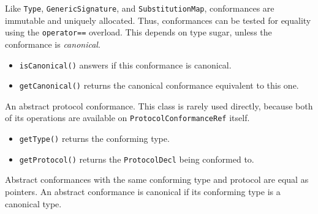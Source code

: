 \documentclass[../generics]{subfiles}
\begin{document}
Like \texttt{Type}, \texttt{GenericSignature}, and \texttt{SubstitutionMap}, conformances are immutable and uniquely allocated. Thus, conformances can be tested for equality using the \texttt{operator==} overload. This depends on type sugar, unless the conformance is \emph{canonical}.
\begin{itemize}
\item \texttt{isCanonical()} answers if this conformance is canonical.
\item \texttt{getCanonical()} returns the canonical conformance equivalent to this one.
\end{itemize}

An abstract protocol conformance. This class is rarely used directly, because both of its operations are available on \texttt{ProtocolConformanceRef} itself.
 \begin{itemize}
\item \texttt{getType()} returns the conforming type.
\item \texttt{getProtocol()} returns the \texttt{ProtocolDecl} being conformed to.
\end{itemize}
Abstract conformances with the same conforming type and protocol are equal as pointers. An abstract conformance is canonical if its conforming type is a canonical type.
\end{document}
